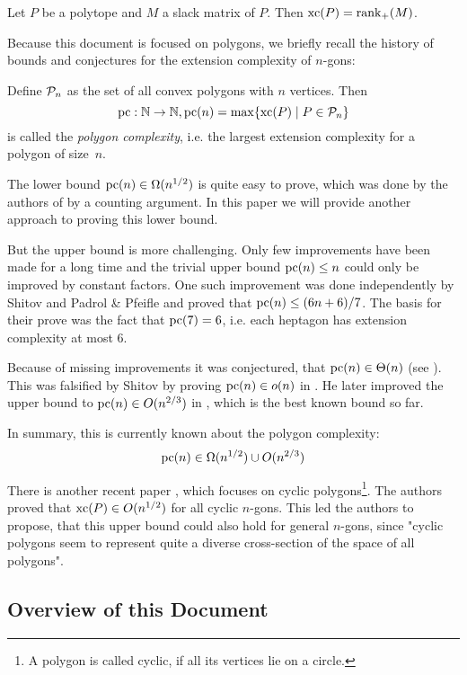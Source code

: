 \begin{theorem}
  Let $P$ be a polytope and $M$ a slack matrix of $P$. Then $\xc(P) = \rank_+(M)$.
\end{theorem}

Because this document is focused on polygons, we briefly recall the history of bounds and conjectures for the extension complexity of $n$-gons:

Define $\P_n$ as the set of all convex polygons with $n$ vertices. Then $$\pc:\N \to \N, \pc(n) = \max \{\xc(P) \mid P \in \P_n\}$$ is called the \emph{polygon complexity}, i.e. the largest extension complexity for a polygon of size~$n$.

The lower bound $\pc(n) \in \Omega(n^{1/2})$ is quite easy to prove, which was done by the authors of \cite{fiorini2012extended} by a counting argument. In this paper we will provide another approach to proving this lower bound. 

But the upper bound is more challenging. Only few improvements have been made for a long time and the trivial upper bound $\pc(n) \leq n$ could only be improved by constant factors. One such improvement was done independently by Shitov \cite{shitov2014upper} and Padrol \& Pfeifle \cite{padrol2014polygons} and proved that $\pc(n) \leq (6n+6)/7$. The basis for their prove was the fact that $\pc(7)=6$, i.e. each heptagon has extension complexity at most 6.

Because of missing improvements it was conjectured, that $\pc(n) \in \Theta(n)$ (see \cite{fiorini2012extended}). This was falsified by Shitov by proving $\pc(n) \in o(n)$ in \cite{shitov2014sublinear}. He later improved the upper bound to $\pc(n) \in O(n^{2/3})$ in \cite{shitov2020sublinear}, which is the best known bound so far.

In summary, this is currently known about the polygon complexity:
$$\pc(n) \in \Omega(n^{1/2}) \cup O(n^{2/3})$$

There is another recent paper \cite{kwan2020extension}, which focuses on cyclic polygons\footnote{A polygon is called cyclic, if all its vertices lie on a circle.}. The authors proved that $\xc(P) \in O(n^{1/2})$ for all cyclic $n$-gons. 
This led the authors to propose, that this upper bound could also hold for general $n$-gons, since "cyclic polygons seem to represent quite a diverse cross-section of the space of all polygons".



\subsection{Overview of this Document}

